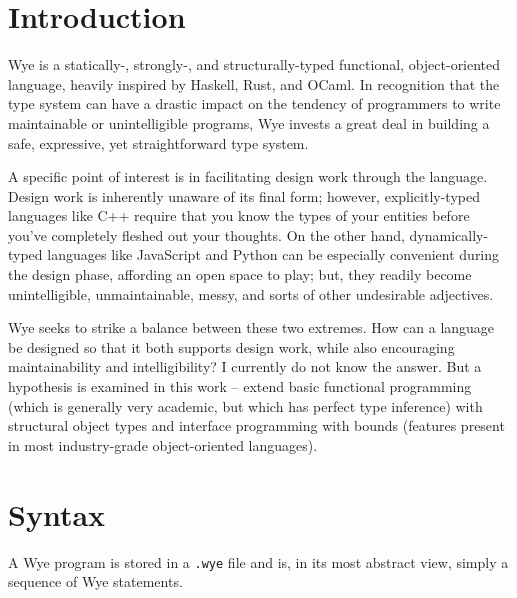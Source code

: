 \documentclass[a4paper, 12pt]{article}
\renewcommand{\tt}{\texttt}
\begin{document}


\section{Introduction}
Wye is a statically-, strongly-, and structurally-typed functional, object-oriented language,
heavily inspired by Haskell, Rust, and OCaml. In recognition that the type system can have
a drastic impact on the tendency of programmers to write maintainable or unintelligible programs,
Wye invests a great deal in building a safe, expressive, yet straightforward type system.

A specific point of interest is in facilitating design work through the language. Design work is inherently
unaware of its final form; however, explicitly-typed languages like C++ require that you know
the types of your entities before you've completely fleshed out your thoughts. On the other hand,
dynamically-typed languages like JavaScript and Python can be especially convenient during the
design phase, affording an open space to play; but, they readily become unintelligible,
unmaintainable, messy, and sorts of other undesirable adjectives.

Wye seeks to strike a balance between these two extremes. How can a language be designed so
that it both supports design work, while also encouraging maintainability and intelligibility? I currently
do not know the answer. But a hypothesis is examined in this work -- extend basic functional programming
(which is generally very academic, but which has perfect type inference) with structural object types
and interface programming with bounds (features present in most industry-grade object-oriented
languages).

\section{Syntax}
A Wye program is stored in a \tt{.wye} file and is, in its most abstract
view, simply a sequence of Wye statements.
\end{document}
